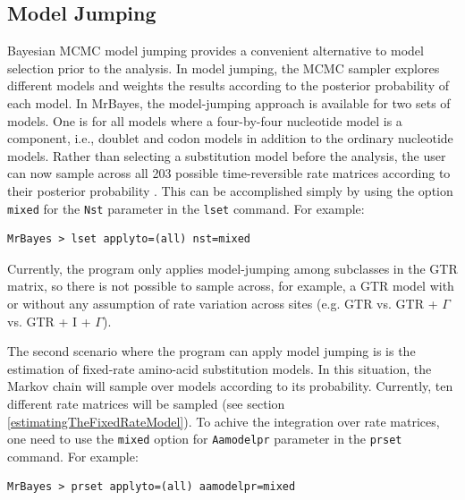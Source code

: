\documentclass[12pt]{book}
\begin{document}
\subsection{Model Jumping}
\label{modelJumping}

Bayesian MCMC model jumping provides a convenient alternative to model selection prior to the
analysis. In model jumping, the MCMC sampler explores different models and weights the results
according to the posterior probability of each model. In MrBayes, the model-jumping approach is
available for two sets of models. One is for all models where a four-by-four nucleotide model is a
component, i.e., doublet and codon models in addition to the ordinary nucleotide models. Rather
than selecting a substitution model before the analysis, the user can now sample across all 203
possible time-reversible rate matrices according to their posterior probability
\citep{huelsenbeck04d}. This can be accomplished simply by using the option \texttt{mixed} for the
\texttt{Nst} parameter in the \texttt{lset} command. For example:

\begin{Verbatim}
MrBayes > lset applyto=(all) nst=mixed
\end{Verbatim}

Currently, the program only applies model-jumping among subclasses in the GTR matrix, so there
is not possible to sample across, for example, a GTR model with or without any assumption of rate
variation across sites (e.g. GTR vs. GTR + $\Gamma$ vs. GTR + I + $\Gamma$).

The second scenario where the program can apply model jumping is is the estimation of fixed-rate
amino-acid substitution models. In this situation, the Markov chain will sample over models
according to its probability. Currently, ten different rate matrices will be sampled (see section
\ref{estimatingTheFixedRateModel}). To achive the integration over rate matrices, one need to use
the \texttt{mixed} option for \texttt{Aamodelpr} parameter in the \texttt{prset} command. For
example:

\begin{Verbatim}
MrBayes > prset applyto=(all) aamodelpr=mixed
\end{Verbatim}
\end{document}
